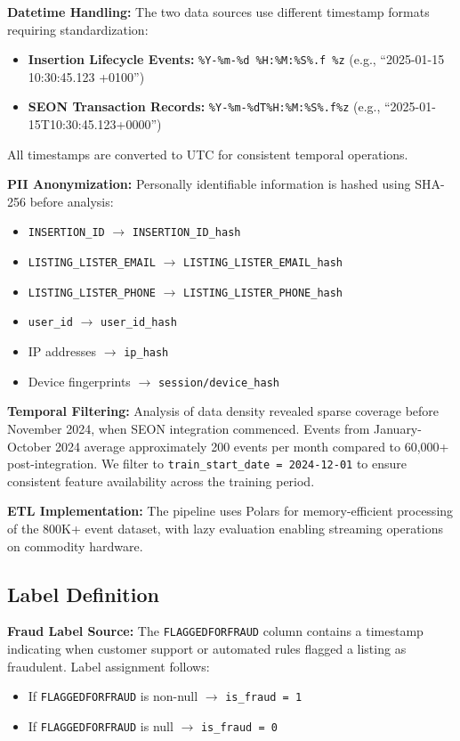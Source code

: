 \textbf{Datetime Handling:} The two data sources use different timestamp formats requiring standardization:
\begin{itemize}
    \item \textbf{Insertion Lifecycle Events:} \texttt{\%Y-\%m-\%d \%H:\%M:\%S\%.f \%z} (e.g., ``2025-01-15 10:30:45.123 +0100'')
    \item \textbf{SEON Transaction Records:} \texttt{\%Y-\%m-\%dT\%H:\%M:\%S\%.f\%z} (e.g., ``2025-01-15T10:30:45.123+0000'')
\end{itemize}

All timestamps are converted to UTC for consistent temporal operations.

\textbf{PII Anonymization:} Personally identifiable information is hashed using SHA-256 before analysis:
\begin{itemize}
    \item \texttt{INSERTION\_ID} $\rightarrow$ \texttt{INSERTION\_ID\_hash}
    \item \texttt{LISTING\_LISTER\_EMAIL} $\rightarrow$ \texttt{LISTING\_LISTER\_EMAIL\_hash}
    \item \texttt{LISTING\_LISTER\_PHONE} $\rightarrow$ \texttt{LISTING\_LISTER\_PHONE\_hash}
    \item \texttt{user\_id} $\rightarrow$ \texttt{user\_id\_hash}
    \item IP addresses $\rightarrow$ \texttt{ip\_hash}
    \item Device fingerprints $\rightarrow$ \texttt{session/device\_hash}
\end{itemize}

\textbf{Temporal Filtering:} Analysis of data density revealed sparse coverage before November 2024, when SEON integration commenced. Events from January-October 2024 average approximately 200 events per month compared to 60,000+ post-integration. We filter to \texttt{train\_start\_date = 2024-12-01} to ensure consistent feature availability across the training period.

\textbf{ETL Implementation:} The pipeline uses Polars for memory-efficient processing of the 800K+ event dataset, with lazy evaluation enabling streaming operations on commodity hardware.

\subsection{Label Definition}

\textbf{Fraud Label Source:} The \texttt{FLAGGEDFORFRAUD} column contains a timestamp indicating when customer support or automated rules flagged a listing as fraudulent. Label assignment follows:
\begin{itemize}
    \item If \texttt{FLAGGEDFORFRAUD} is non-null $\rightarrow$ \texttt{is\_fraud = 1}
    \item If \texttt{FLAGGEDFORFRAUD} is null $\rightarrow$ \texttt{is\_fraud = 0}
\end{itemize}

